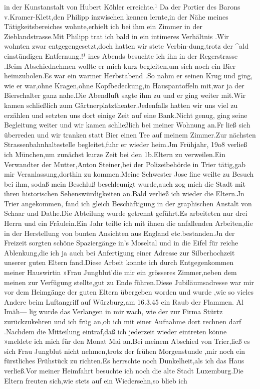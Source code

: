 \documentclass[a4paper,11pt]{article}
\begin{document}
  in der Kunstanstalt von Hubert Köhler erreichte.¹ Da der Portier des Barons v.Kramer-Klett,den Philipp inzwischen kennen lernte,in der Nähe meines Tätigkeitsbereiches wohnte,erhielt ich bei ihm ein Zimmer in der Zieblandstrasse.Mit Philipp trat ich bald in ein intimeres Verhältnis .Wir wohnten zwar entgegengesetzt,doch hatten wir stete Verbin-dung,trotz der ^ald einstündigen Entfernung.!¹ ines Abends besuchte ich ihn in der Regerstrasse .Beim Abschiednehmen wollte er mich kurz begleiten,um sich noch ein Bier heimzuholen.Es war ein warmer Herbstabend .So nahm er seinen Krug und ging, wie er war,ohne Kragen,ohne Kopfbedeckung,in Hauspantoffeln mit,war ja der Bierschalter ganz nahe.Die Abendluft sagte ihm zu und er ging weiter mit.Wir kamen schließlich zum Gärtnerplatztheater.Jedenfalls hatten wir uns viel zu erzählen und setzten uns dort einige Zeit auf eine Bank.Nicht genug, ging seine Begleitung weiter und wir kamen schließlich bei meiner Wohnung an.Fr ließ sich überreden und wir tranken statt Bier einen Tee auf meinem Zimmer.Zur nächsten Strassenbahnhaltestelle begleitet,fuhr er wieder heim.Jm Frühjahr, 19o8 verließ ich München,um zunächst kurze Zeit bei den 1b.Eltern zu verweilen.Ein Verwandter der Mutter,Anton Steiner,bei der Polizeibehörde in Trier tätig,gab mir Veranlassung,dorthin zu kommen.Meine Schwester Jose fine weilte zu Besuch bei ihm, sodaß mein Beschluß beschleunigt wurde,auch zog mich die Stadt mit ihren historischen Sehenswürdigkeiten an.Bald verließ ich wieder die Eltern.Jn Trier angekommen, fand ich gleich Beschäftigung in der graphischen Anstalt von Schaar und Dathe.Die Abteilung wurde getrennt geführt.Es arbeiteten nur drei Herrn und ein Fräulein.Ein Jahr teilte ich mit ihnen die anfallenden Arbeiten,die in der Herstellung von bunten Ansichten aus England etc.bestanden.Jn der Freizeit sorgten schöne Spaziergänge in's Moseltal und in die Eifel für reiche Ablenkung,die ich ja auch bei Anfertigung einer Adresse zur Silberhochzeit unserer guten Eltern fand.Diese Arbeit konnte ich durch Entgegenkommen meiner Hauswirtin »Frau Jungblut'die mir ein grösseres Zimmer,neben dem meinen zur Verfügung stellte,gut zu Ende führen.Diese Jubiläumsadresse war mir vor dem Heimgänge der guten Eltern übergeben worden und wurde ,wie so vieles Andere beim Luftangriff auf Würzburg,am 16.3.45 ein Raub der Flammen. Al Imäh— lig wurde das Verlangen in mir wach, wie der zur Firma Stürtz zurückzukehren und ich früg an,ob ich mit einer Aufnahme dort rechnen darf .Nachdem die Mitteilung eintraf,daß ich jederzeit wieder eintreten könne »meldete ich mich für den Monat Mai an.Bei meinem Abschied von Trier,ließ es sich Frau Jungblut nicht nehmen,trotz der frühen Morgenstunde ,mir noch ein fürstliches Frühstück zu richten.Es herrschte noch Dunkelheit,als ich das Haus verließ.Vor meiner Heimfahrt besuchte ich noch die alte Stadt Luxemburg.Die Eltern freuten sich,wie stets auf ein Wiedersehn,so blieb ich
\end{document}
